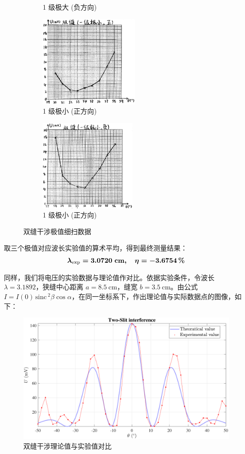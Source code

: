 \documentclass[UTF8]{article}
\def\sinc{\mathrm{\,sinc}\,}
\theoremstyle{MyLineTheoremStyle} %
\theoremstyle{MyBlockTheoremStyle} %
\theoremstyle{MySubsubsectionStyle} %
\begin{document}
\begin{figure}[H]
\begin{subfigure}[b]{0.5\columnwidth}
    \caption{1 级极大 (负方向)}
\end{subfigure}
\begin{subfigure}[b]{0.5\columnwidth}\centering
    \includegraphics[height=132pt]{assets/2 双缝/双 1小+.png}
    \caption{1 级极小 (正方向)}
\end{subfigure}\hfill
\begin{subfigure}[b]{0.5\columnwidth}\centering
    \includegraphics[height=132pt]{assets/2 双缝/双 1小-.png}
    \caption{1 级极小 (正方向)}
\end{subfigure}
\caption{双缝干涉极值细扫数据}
\end{figure}

取三个极值对应波长实验值的算术平均，得到最终测量结果：
\begin{equation}\boldmath
    \lambda_{\text{exp}} = 3.0720 \ \mathrm{cm},\quad \eta = - 3.6754\, \%
\end{equation}

同样，我们将电压的实验数据与理论值作对比。依据实验条件，令波长 $\lambda = 3.1892$，狭缝中心距离 $a = 8.5 \ \mathrm{cm}$，缝宽 $b = 3.5 \ \mathrm{cm}$。由公式 $I = I(0)\sinc^2 \beta \cos \alpha $，在同一坐标系下，作出理论值与实际数据点的图像，如下：
\begin{figure}[H]\centering
\includegraphics[width=\columnwidth]{assets/2 双缝/双缝 对比.pdf}
\caption{双缝干涉理论值与实验值对比}\label{双缝干涉理论值与实验值对比}
\end{figure}
\end{document}
